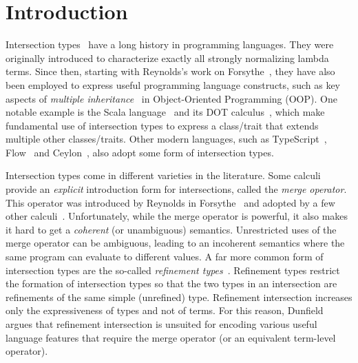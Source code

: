 
\section{Introduction}
\label{sec:intro}

Intersection types~\cite{pottinger1980type,coppo1981functional} have a long
history in programming languages. They were originally introduced to
characterize exactly all strongly normalizing lambda terms. Since then,
starting with Reynolds's work on
Forsythe~\cite{reynolds1988preliminary}, they have also been employed
to express useful programming language constructs, such as key
aspects of \emph{multiple inheritance}~\cite{compagnoni1996higher} in
Object-Oriented Programming (OOP). One notable
example is the Scala
language~\cite{odersky2004overview} and its DOT
calculus~\cite{amin2012dependent}, which make fundamental use of intersection
types to express a class/trait that extends multiple other classes/traits. Other
modern languages, such as TypeScript~\cite{typescript}, Flow~\cite{flow} and
Ceylon~\cite{ceylon}, also adopt some form of intersection types.

Intersection types come in different varieties in the literature. Some calculi
provide an \emph{explicit} introduction form for intersections, called the
\emph{merge operator}. This operator was introduced by Reynolds in Forsythe~\cite{reynolds1988preliminary} and
adopted by a few other calculi~\cite{Castagna_1992,
  dunfield2014elaborating, oliveira2016disjoint, alpuimdisjoint}. Unfortunately,
while the merge operator is powerful, it also makes it hard to get a \emph{coherent}
(or unambiguous) semantics. 
Unrestricted uses of the merge operator can be ambiguous, leading to an incoherent semantics
where the same program can evaluate to different values. 
A far more common form of intersection types are the so-called \emph{refinement
  types}~\cite{Freeman_1991, Davies_2000, dunfield2003type}. Refinement types
restrict the formation of intersection types so that the two types in an
intersection are refinements of the same simple (unrefined) type. Refinement
intersection increases only the expressiveness of types and not of terms. 
For this reason, Dunfield~\cite{dunfield2014elaborating} argues that refinement
intersection is unsuited for encoding various useful language features
that require the merge operator (or an equivalent term-level operator).

